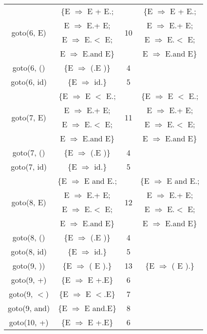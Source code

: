 \begin{table}[H]
\begin{minipage}[t]{.4\linewidth}
\begin{tabular}{|c|c|c|c|}
      \hline
      \multirow{4}{*}{goto(6, E)} & \{E $\Rightarrow$ E + E.; & \multirow{4}{*}{10}	& \{E $\Rightarrow$ E + E.; \\
      & E $\Rightarrow$ E.+ E; & & E $\Rightarrow$ E.+ E; \\
      & E $\Rightarrow$ E.$<$ E; & & E $\Rightarrow$ E.$<$ E; \\
      & E $\Rightarrow$ E.and E\} & & E $\Rightarrow$ E.and E\} \\
      \hline
      goto(6, () & \{E $\Rightarrow$ (.E )\}	& 4 & \\
      \hline
      goto(6, id)	& \{E $\Rightarrow$ id.\} & 5 & \\
      \hline
      \multirow{4}{*}{goto(7, E)} & \{E $\Rightarrow$ E $<$ E.; & \multirow{4}{*}{11} & \{E $\Rightarrow$ E $<$ E.; \\
      & E $\Rightarrow$ E.+ E; & & E $\Rightarrow$ E.+ E; \\
      & E $\Rightarrow$ E.$<$ E; & & E $\Rightarrow$ E.$<$ E; \\
      & E $\Rightarrow$ E.and E\}	& & E $\Rightarrow$ E.and E\} \\
      \hline
      goto(7, () & \{E $\Rightarrow$ (.E )\}	& 4 & \\
      \hline
      goto(7, id)	& \{E $\Rightarrow$ id.\} & 5 & \\
      \hline
      \multirow{4}{*}{goto(8, E)} & \{E $\Rightarrow$ E and E.; & \multirow{4}{*}{12} & \{E $\Rightarrow$ E and E.; \\
      & E $\Rightarrow$ E.+ E; & & E $\Rightarrow$ E.+ E; \\
      & E $\Rightarrow$ E.$<$ E; & & E $\Rightarrow$ E.$<$ E; \\
      & E $\Rightarrow$ E.and E\}	& & E $\Rightarrow$ E.and E\} \\
      \hline
      goto(8, () & \{E $\Rightarrow$ (.E )\}	& 4 & \\
      \hline
      goto(8, id)	& \{E $\Rightarrow$ id.\} & 5 & \\
      \hline
      goto(9, )) & \{E $\Rightarrow$ ( E ).\} & 13	& \{E $\Rightarrow$ ( E ).\} \\
      \hline
      goto(9, +) & \{E $\Rightarrow$ E +.E\}	& 6 & \\
      \hline
      goto(9, $<$) & \{E $\Rightarrow$ E $<$.E\}	& 7 & \\
      \hline
      goto(9, and) & \{E $\Rightarrow$ E and.E\}	& 8 & \\
      \hline
      goto(10, +)	& \{E $\Rightarrow$ E +.E\} & 6 & \\

\end{tabular}
\end{minipage}
\end{table}
